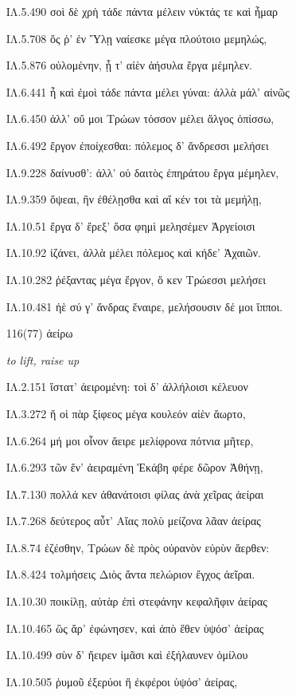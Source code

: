 \begin{enumerate}
{ΙΛ.5.490 σοὶ δὲ χρὴ τάδε πάντα μέλειν νύκτάς τε καὶ ἦμαρ

ΙΛ.5.708 ὅς ῥ' ἐν Ὕλῃ ναίεσκε μέγα πλούτοιο μεμηλώς,

ΙΛ.5.876 οὐλομένην, ᾗ τ' αἰὲν ἀήσυλα ἔργα μέμηλεν.

ΙΛ.6.441 ἦ καὶ ἐμοὶ τάδε πάντα μέλει γύναι: ἀλλὰ μάλ' αἰνῶς

ΙΛ.6.450 ἀλλ' οὔ μοι Τρώων τόσσον μέλει ἄλγος ὀπίσσω,

ΙΛ.6.492 ἔργον ἐποίχεσθαι: πόλεμος δ' ἄνδρεσσι μελήσει

ΙΛ.9.228 δαίνυσθ': ἀλλ' οὐ δαιτὸς ἐπηράτου ἔργα μέμηλεν,

ΙΛ.9.359 ὄψεαι, ἢν ἐθέλῃσθα καὶ αἴ κέν τοι τὰ μεμήλῃ,

ΙΛ.10.51 ἔργα δ' ἔρεξ' ὅσα φημὶ μελησέμεν Ἀργείοισι

ΙΛ.10.92 ἱζάνει, ἀλλὰ μέλει πόλεμος καὶ κήδε' Ἀχαιῶν.

ΙΛ.10.282 ῥέξαντας μέγα ἔργον, ὅ κεν Τρώεσσι μελήσει

ΙΛ.10.481 ἠὲ σύ γ' ἄνδρας ἔναιρε, μελήσουσιν δέ μοι ἵπποι.

}

\clearpage
\item[\large 116(77)]{\large \g ἀείρω}

\hspace{0.2cm} \textit{ to lift, raise up }

{\g
ΙΛ.2.151 ἵστατ' ἀειρομένη: τοὶ δ' ἀλλήλοισι κέλευον

ΙΛ.3.272 ἥ οἱ πὰρ ξίφεος μέγα κουλεόν αἰὲν ἄωρτο,

ΙΛ.6.264 μή μοι οἶνον ἄειρε μελίφρονα πότνια μῆτερ,

ΙΛ.6.293 τῶν ἕν' ἀειραμένη Ἑκάβη φέρε δῶρον Ἀθήνῃ,

ΙΛ.7.130 πολλά κεν ἀθανάτοισι φίλας ἀνὰ χεῖρας ἀείραι

ΙΛ.7.268 δεύτερος αὖτ' Αἴας πολὺ μείζονα λᾶαν ἀείρας

ΙΛ.8.74 ἑζέσθην, Τρώων δὲ πρὸς οὐρανὸν εὐρὺν ἄερθεν:

ΙΛ.8.424 τολμήσεις Διὸς ἄντα πελώριον ἔγχος ἀεῖραι.

ΙΛ.10.30 ποικίλῃ, αὐτὰρ ἐπὶ στεφάνην κεφαλῆφιν ἀείρας

ΙΛ.10.465 ὣς ἄρ' ἐφώνησεν, καὶ ἀπὸ ἕθεν ὑψόσ' ἀείρας

ΙΛ.10.499 σὺν δ' ἤειρεν ἱμᾶσι καὶ ἐξήλαυνεν ὁμίλου

ΙΛ.10.505 ῥυμοῦ ἐξερύοι ἢ ἐκφέροι ὑψόσ' ἀείρας,

}
\end{enumerate}
